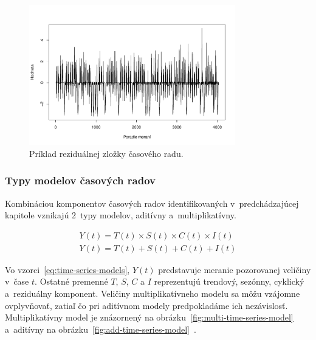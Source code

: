 \documentclass[a4paper,twoside,slovak,12pt,appendix]{article}
\begin{document}
\begin{figure}[H]
  \centering
  \includegraphics[width=0.8\textwidth]{random_component.pdf}
  \caption{Príklad reziduálnej zložky časového radu.}
  \label{fig:random-component}
\end{figure}

\subsubsection{Typy modelov časových radov}
Kombináciou komponentov časových radov identifikovaných v~predchádzajúcej
kapitole vznikajú 2~typy modelov, aditívny a~multiplikatívny.

\begin{equation}
  \begin{split}
    Y(t) = T(t) \times S(t) \times C(t) \times I(t)
    \\
    Y(t) = T(t) + S(t) + C(t) + I(t)
  \end{split}
  \label{eq:time-series-models}
\end{equation}

Vo vzorci~\ref{eq:time-series-models}, $Y(t)$ predstavuje meranie pozorovanej
veličiny v~čase $t$. Ostatné premenné $T$, $S$, $C$ a $I$ reprezentujú trendový,
sezónny, cyklický a~reziduálny komponent. Veličiny multiplikatívneho modelu sa
môžu vzájomne ovplyvňovať, zatiaľ čo pri aditívnom modely predpokladáme ich
nezávislosť. Multiplikatívny model je znázornený na
obrázku~\ref{fig:multi-time-series-model} a~aditívny na
obrázku~\ref{fig:add-time-series-model}~\cite{Agrawal2013}.
\end{document}
